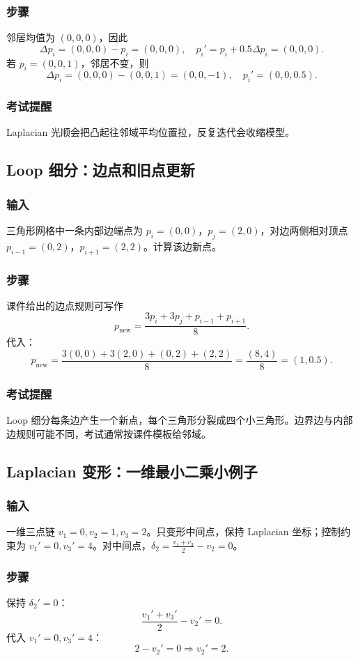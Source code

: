 \documentclass[UTF8,fontset=fandol,11pt]{ctexart}
\begin{document}
\subsubsection*{步骤}
邻居均值为 $(0,0,0)$，因此
\[
\Delta p_i=(0,0,0)-p_i=(0,0,0),\quad p_i'=p_i+0.5\Delta p_i=(0,0,0).
\]
若 $p_i=(0,0,1)$，邻居不变，则
\[
\Delta p_i=(0,0,0)-(0,0,1)=(0,0,-1),\quad p_i'=(0,0,0.5).
\]
\subsubsection*{考试提醒}
Laplacian 光顺会把凸起往邻域平均位置拉，反复迭代会收缩模型。

\subsection{Loop 细分：边点和旧点更新}
\subsubsection*{输入}
三角形网格中一条内部边端点为 $p_i=(0,0)$，$p_j=(2,0)$，对边两侧相对顶点 $p_{i-1}=(0,2)$，$p_{i+1}=(2,2)$。计算该边新点。
\subsubsection*{步骤}
课件给出的边点规则可写作
\[
p_{\text{new}}=\frac{3p_i+3p_j+p_{i-1}+p_{i+1}}{8}.
\]
代入：
\[
p_{\text{new}}=\frac{3(0,0)+3(2,0)+(0,2)+(2,2)}{8}
=\frac{(8,4)}{8}=(1,0.5).
\]
\subsubsection*{考试提醒}
Loop 细分每条边产生一个新点，每个三角形分裂成四个小三角形。边界边与内部边规则可能不同，考试通常按课件模板给邻域。

\subsection{Laplacian 变形：一维最小二乘小例子}
\subsubsection*{输入}
一维三点链 $v_1=0,v_2=1,v_3=2$。只变形中间点，保持 Laplacian 坐标；控制约束为 $v_1'=0,v_3'=4$。对中间点，$\delta_2=\frac{v_1+v_3}{2}-v_2=0$。
\subsubsection*{步骤}
保持 $\delta_2'=0$：
\[
\frac{v_1'+v_3'}{2}-v_2'=0.
\]
代入 $v_1'=0,v_3'=4$：
\[
2-v_2'=0\Rightarrow v_2'=2.
\]
\end{document}
